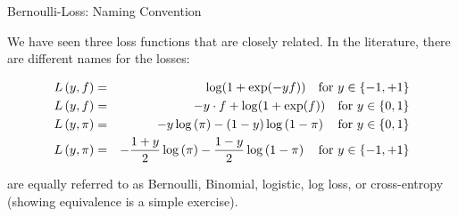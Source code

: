\documentclass[11pt,compress,t,notes=noshow, xcolor=table]{beamer}
\begin{document}
\begin{vbframe}{Bernoulli-Loss: Naming Convention}

We have seen three loss functions that are closely related. In the literature, there are different names for the losses: 


\begin{eqnarray*} L\left(y, f\right) &=& \log(1+\exp(-yf)) \quad \text{for } y \in \{-1, +1\} \\
L\left(y, f\right) &=& - y \cdot f + \log(1 + \exp(f)) \quad \text{for } y \in \{0, 1\} \\
L\left(y, \pi\right) &=& - y \log \left(\pi\right) - (1 - y) \log \left(1 - \pi\right) \quad \text{for } y \in \{0, 1\} \\
L\left(y, \pi\right) &=& - \frac{1 + y}{2} \log\left(\pi\right) - \frac{1 - y}{2} \log\left(1 - \pi\right) \quad \text{for } y \in \{-1, +1\} \end{eqnarray*}

\lz

are equally referred to as Bernoulli, Binomial, logistic, log loss, or cross-entropy (showing equivalence is a simple exercise).





\end{vbframe}








\end{document}

